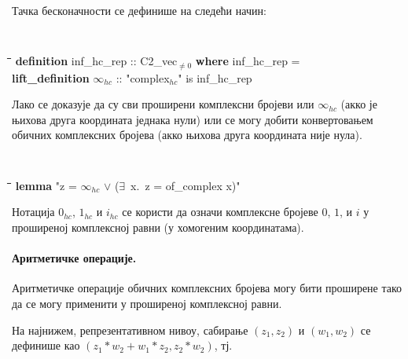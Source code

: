 \noindent Тачка бесконачности се дефинише на следећи начин:
{\tt
\begin{tabbing}
\hspace{5mm}\=\hspace{5mm}\=\hspace{5mm}\=\hspace{5mm}\=\hspace{5mm}\=\kill
\textbf{definition} inf\_hc\_rep :: C2\_vec$_{\neq 0}$ \textbf{where} inf\_hc\_rep = \\
\textbf{lift\_definition} $\infty_{hc}$ :: "complex$_{hc}$" is inf\_hc\_rep
\end{tabbing}
}

Лако се доказује да су сви проширени комплексни бројеви или
$\infty_{hc}$ (акко је њихова друга координата једнака нули) или се
могу добити конвертовањем обичних комплексних бројева (акко њихова
друга координата није нула).
{\tt
\begin{tabbing}
\hspace{5mm}\=\hspace{5mm}\=\hspace{5mm}\=\hspace{5mm}\=\hspace{5mm}\=\kill
\textbf{lemma}  "z = $\infty_{hc}$ $\vee$ ($\exists$\ x.\ z = of\_complex x)"
\end{tabbing}
}

Нотација $0_{hc}$, $1_{hc}$ и $i_{hc}$ се користи да означи комплексне
бројеве $0$, $1$, и $i$ у проширеној комплексној равни (у хомогеним
координатама).

\paragraph{Аритметичке операције.} Аритметичке операције обичних
комплексних бројева могу бити проширене тако да се могу применити у
проширеној комплексној равни.

На најнижем, репрезентативном нивоу, сабирање $(z_1, z_2)$ и
$(w_1, w_2)$ се дефинише као $(z_1*w_2 + w_1*z_2, z_2*w_2)$, тј. 

